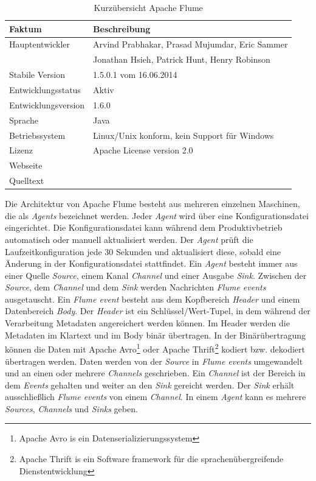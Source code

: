 \begin{table}[tbp]
	\centering
		\begin{tabular}{@{}ll@{}} \toprule
			\textbf{Faktum} & \textbf{Beschreibung} \\ \midrule
			Hauptentwickler & Arvind Prabhakar, Prasad Mujumdar, Eric Sammer \\
			& Jonathan Hsieh, Patrick Hunt, Henry Robinson \\
			Stabile Version & 1.5.0.1 vom 16.06.2014 \\ 
			Entwicklungsstatus &  Aktiv \\
			Entwicklungsversion & 1.6.0 \\
			Sprache & Java \\
			Betriebssystem & Linux/Unix konform, kein Support für Windows  \\
			Lizenz & Apache License version 2.0 \\
			Webseite & \citeint{flume:home} \\
			Quelltext & \citeint{flume:GitHubApacheMirror} \\			
			\bottomrule			
		\end{tabular}
	\caption{Kurzübersicht Apache Flume}
	\label{tab:vorflume}
\end{table}


Die Architektur von Apache Flume besteht aus mehreren einzelnen Maschinen, die als \textit{Agents} bezeichnet werden. Jeder \textit{Agent} wird über eine Konfigurationsdatei eingerichtet. Die Konfigurationsdatei kann während dem Produktivbetrieb automatisch oder manuell aktualisiert werden. Der \textit{Agent} prüft die Laufzeitkonfiguration jede 30 Sekunden und aktualisiert diese, sobald eine Änderung in der Konfigurationsdatei stattfindet. Ein \textit{Agent} besteht immer aus einer Quelle \textit{Source}, einem Kanal \textit{Channel} und einer Ausgabe \textit{Sink}. Zwischen der \textit{Source}, dem \textit{Channel} und dem \textit{Sink} werden Nachrichten \textit{Flume events} ausgetauscht. Ein \textit{Flume event} besteht aus dem Kopfbereich \textit{Header} und einem Datenbereich \textit{Body}. Der \textit{Header} ist ein Schlüssel/Wert-Tupel, in dem während der Verarbeitung Metadaten angereichert werden können. Im Header werden die Metadaten im Klartext und im Body binär übertragen. In der Binärübertragung können die Daten mit Apache Avro\footnote{Apache Avro is ein Datenserializierungssystem } oder Apache Thrift\footnote{Apache Thrift is ein Software framework für die sprachenübergreifende Dienstentwicklung } kodiert bzw. dekodiert übertragen werden. Daten werden von der \textit{Source} in \textit{Flume events} umgewandelt und an einen oder mehrere \textit{Channels} geschrieben. Ein \textit{Channel} ist der Bereich in dem \textit{Events} gehalten und weiter an den \textit{Sink} gereicht werden. Der \textit{Sink} erhält ausschließlich \textit{Flume events} von einem \textit{Channel}. In einem \textit{Agent} kann es mehrere \textit{Sources}, \textit{Channels} und \textit{Sinks} geben. 

